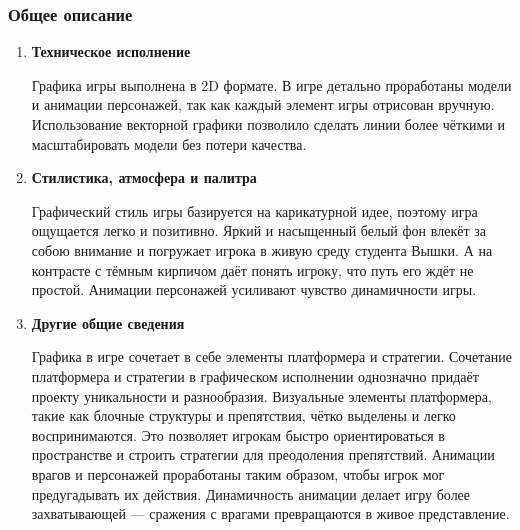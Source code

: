 \documentclass{article}
\begin{document}
\subsubsection{Общее описание}
    \begin{enumerate}
    \item \textbf{Техническое исполнение} \par
    Графика игры выполнена в 2D формате. В игре детально проработаны модели и анимации персонажей, так как каждый элемент игры отрисован вручную. Использование векторной графики позволило сделать линии более чёткими и масштабировать модели без потери качества.
    \item\textbf{Стилистика, атмосфера и палитра} \par
    Графический стиль игры базируется на карикатурной идее, поэтому игра ощущается легко и позитивно. Яркий и насыщенный белый фон влекёт за собою внимание и погружает игрока в живую среду студента Вышки. А на контрасте с тёмным кирпичом даёт понять игроку, что путь его ждёт не простой. Анимации персонажей усиливают чувство динамичности игры.
    \item \textbf{Другие общие сведения} \par
    Графика в игре сочетает в себе элементы платформера и стратегии. Сочетание платформера и стратегии в графическом исполнении однозначно придаёт проекту уникальности и разнообразия. Визуальные элементы платформера, такие как блочные структуры и препятствия, чётко выделены и легко воспринимаются. Это позволяет игрокам быстро ориентироваться в пространстве и строить стратегии для преодоления препятствий. Анимации врагов и персонажей проработаны таким образом, чтобы игрок мог предугадывать их действия. Динамичность анимации делает игру более захватывающей — сражения с врагами превращаются в живое представление.
    \end{enumerate}
\end{document}
